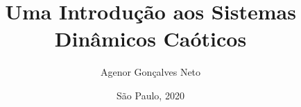 \documentclass[a4paper, 12pt]{article}
\title{Uma Introdução aos Sistemas Dinâmicos Caóticos}
\author{Agenor Gonçalves Neto}
\date{São Paulo, 2020}
\theoremstyle{definition}
\theoremstyle{plain}
\begin{document}
\maketitle
\tableofcontents













\nocite{devaney}


\end{document}
